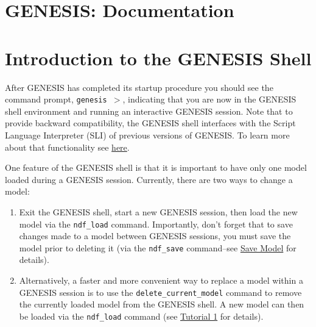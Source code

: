 \documentclass[12pt]{article}
\begin{document}
\section*{GENESIS: Documentation}

\section*{Introduction to the GENESIS Shell}

After GENESIS has completed its startup procedure you should see the command prompt, {\tt genesis $>$}, indicating that you are now in the GENESIS shell environment and running an interactive GENESIS session. Note that to provide backward compatibility, the GENESIS shell interfaces with the Script Language Interpreter (SLI) of previous versions of GENESIS. To learn more about that functionality see \href{../backward-compatibility/backward-compatibility.tex}{here}.

One feature of the GENESIS shell is that it is important to have only one model loaded during a GENESIS session. Currently, there are two ways to change a model:

\begin{enumerate}

\item Exit the GENESIS shell, start a new GENESIS session, then load the new model  via the {\tt ndf\_load} command. Importantly, don't forget that to save changes made to a model between GENESIS sessions, you must save the model prior to deleting it (via the {\tt ndf\_save} command--see \href{../tutorial1/tutorial1.tex}{Save Model} for details).

\item Alternatively, a faster and more convenient way to replace a model within a GENESIS session is to use the {\tt delete\_current\_model} command to remove the currently loaded model from the GENESIS shell. A new model can then be loaded via the {\tt ndf\_load} command (see \href{../tutorial1/tutorial1.tex}{Tutorial 1} for details).

\end{enumerate}
\end{document}
